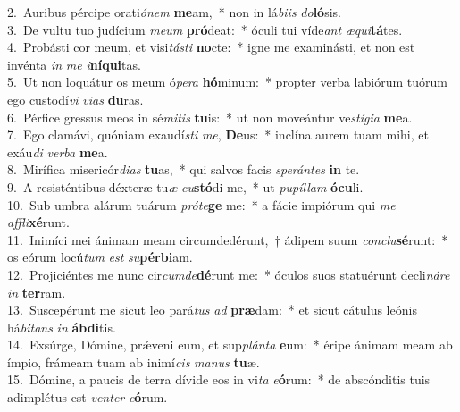 {2.~}Auribus pércipe orati\textit{ó}\textit{nem} \textbf{me}am,~* non in lá\textit{bi}\textit{is} \textit{do}\textbf{ló}sis.\\
{3.~}De vultu tuo judícium \textit{me}\textit{um} \textbf{pró}deat:~* óculi tui víde\textit{ant} \textit{æ}\textit{qui}\textbf{tá}tes.\\
{4.~}Probásti cor meum, et visi\textit{tá}\textit{sti} \textbf{no}cte:~* igne me examinásti, et non est invénta \textit{in} \textit{me} \textit{i}\textbf{ní}\textbf{qui}tas.\\
{5.~}Ut non loquátur os meum ó\textit{pe}\textit{ra} \textbf{hó}minum:~* propter verba labiórum tuórum ego custodí\textit{vi} \textit{vi}\textit{as} \textbf{du}ras.\\
{6.~}Pérfice gressus meos in sé\textit{mi}\textit{tis} \textbf{tu}is:~* ut non moveántur ve\textit{stí}\textit{gi}\textit{a} \textbf{me}a.\\
{7.~}Ego clamávi, quóniam exaudí\textit{sti} \textit{me}, \textbf{De}us:~* inclína aurem tuam mihi, et exáu\textit{di} \textit{ver}\textit{ba} \textbf{me}a.\\
{8.~}Mirífica misericór\textit{di}\textit{as} \textbf{tu}as,~* qui salvos facis \textit{spe}\textit{rán}\textit{tes} \textbf{in} te.\\
{9.~}A resisténtibus déxteræ tu\textit{æ} \textit{cu}\textbf{stó}di me,~* ut \textit{pu}\textit{píl}\textit{lam} \textbf{ó}\textbf{cu}li.\\
{10.~}Sub umbra alárum tuárum \textit{pró}\textit{te}\textbf{ge} me:~* a fácie impiórum qui \textit{me} \textit{af}\textit{fli}\textbf{xé}runt.\\
{11.~}Inimíci mei ánimam meam circumdedérunt,~† ádipem suum \textit{con}\textit{clu}\textbf{sé}runt:~* os eórum locú\textit{tum} \textit{est} \textit{su}\textbf{pér}\textbf{bi}am.\\
{12.~}Projiciéntes me nunc cir\textit{cum}\textit{de}\textbf{dé}runt me:~* óculos suos statuérunt decli\textit{ná}\textit{re} \textit{in} \textbf{ter}ram.\\
{13.~}Suscepérunt me sicut leo pará\textit{tus} \textit{ad} \textbf{præ}dam:~* et sicut cátulus leónis há\textit{bi}\textit{tans} \textit{in} \textbf{áb}\textbf{di}tis.\\
{14.~}Exsúrge, Dómine, prǽveni eum, et sup\textit{plán}\textit{ta} \textbf{e}um:~* éripe ánimam meam ab ímpio, frámeam tuam ab inimí\textit{cis} \textit{ma}\textit{nus} \textbf{tu}æ.\\
{15.~}Dómine, a paucis de terra dívide eos in vi\textit{ta} \textit{e}\textbf{ó}rum:~* de abscónditis tuis adimplétus est \textit{ven}\textit{ter} \textit{e}\textbf{ó}rum.\\
